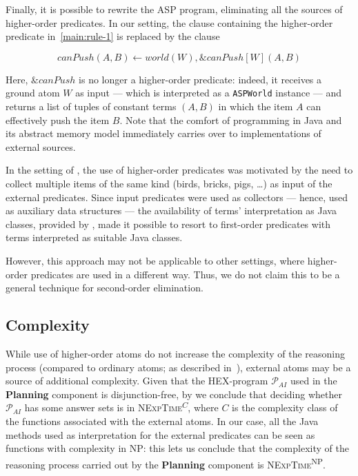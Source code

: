 Finally, it is possible to rewrite the ASP program, eliminating all the sources of higher-order predicates.
In our setting, the clause containing the higher-order predicate in~\eqref{main:rule-1} is replaced by the clause

$$ canPush(A,B) \leftarrow world(W), \&canPush[W](A,B) \label{main:rule-3} $$

Here, $\&canPush$ is no longer a higher-order predicate: indeed, it receives a ground atom $W$ as input --- which is interpreted as a \texttt{ASPWorld} instance --- and returns a list of tuples of constant terms $(A,B)$ in which the item $A$ can effectively push the item $B$. Note that the comfort of programming in Java and its abstract memory model immediately carries over to implementations of external sources.

In the setting of \ah, the use of higher-order predicates was motivated by the need to collect multiple items of the same kind (birds, bricks, pigs, \ldots) as input of the external predicates.
Since input predicates were used as collectors --- hence, used as auxiliary data structures --- the availability of terms' interpretation as Java classes, provided by \al, made it possible to resort to first-order predicates with terms interpreted as suitable Java classes.

However, this approach may not be applicable to other settings, where higher-order predicates are used in a different way.
Thus, we do not claim this to be a general technique for second-order elimination.

\subsection{Complexity}

While use of higher-order atoms do not increase the complexity of the reasoning process (compared to ordinary atoms; as described in~\cite{hex}), external atoms may be a source of additional complexity.
Given that the HEX-program $\mathcal{P}_{AI}$ used in the \textbf{Planning} component is disjunction-free, by \cite[Theorem 8]{hex} we conclude that deciding whether $\mathcal{P}_{AI}$ has some answer sets is in \textsc{NExpTime}\textsuperscript{\(C\)}, where \(C\) is the complexity class of the functions associated with the external atoms.
In our case, all the Java methods used as interpretation for the external predicates can be seen as functions with complexity in \textsc{NP}: this lets us conclude that the complexity of the reasoning process carried out by the \textbf{Planning} component is \textsc{NExpTime}\textsuperscript{\textsc{NP}}.
